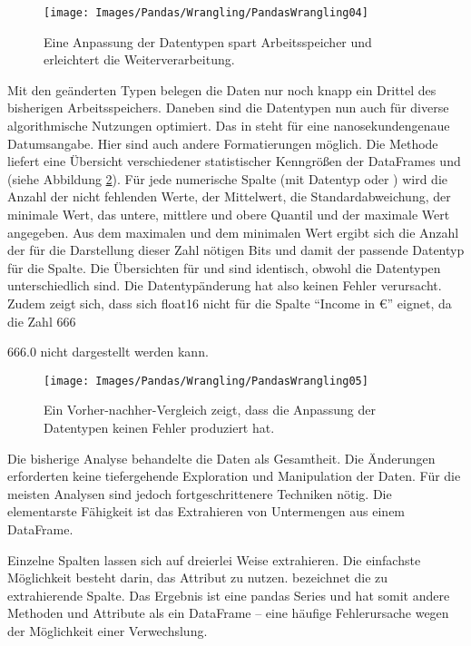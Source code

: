 \begin{figure}
    \centering
    \texttt{[image: Images/Pandas/Wrangling/PandasWrangling04]}    
    \caption{Eine Anpassung der Datentypen spart Arbeitsspeicher und erleichtert die Weiterverarbeitung.} \label{PandasWrangling04}
\end{figure}

Mit den geänderten Typen belegen die Daten nur noch knapp ein Drittel des bisherigen Arbeitsspeichers. Daneben sind die Datentypen nun auch für diverse algorithmische Nutzungen  optimiert. Das  in  steht für eine nanosekundengenaue   Datumsangabe. Hier sind auch andere Formatierungen möglich. Die Methode  liefert eine Übersicht verschiedener statistischer Kenngrößen der DataFrames  und  (siehe Abbildung  \ref{PandasWrangling05}). Für jede numerische Spalte (mit Datentyp  oder ) wird die Anzahl der nicht fehlenden Werte, der Mittelwert, die Standardabweichung, der minimale Wert, das untere, mittlere und obere Quantil und der maximale Wert angegeben. Aus dem maximalen und dem minimalen Wert ergibt sich die Anzahl der für die Darstellung dieser Zahl nötigen Bits und damit der passende Datentyp für die Spalte. Die Übersichten für  und  sind identisch, obwohl die Datentypen unterschiedlich sind. Die Datentypänderung hat also keinen Fehler verursacht. Zudem zeigt sich, dass sich float16 nicht für die Spalte ``Income in \euro{}'' eignet, da die Zahl 666
             
666.0 nicht dargestellt werden kann.

\begin{figure}
    \centering
    \texttt{[image: Images/Pandas/Wrangling/PandasWrangling05]}    
    \caption{Ein Vorher-nachher-Vergleich zeigt, dass die Anpassung der Datentypen keinen Fehler produziert hat.} \label{PandasWrangling05}
\end{figure}

Die bisherige Analyse behandelte die Daten als Gesamtheit. Die Änderungen erforderten keine tiefergehende Exploration und Manipulation der Daten. Für die meisten Analysen sind jedoch fortgeschrittenere Techniken nötig. Die elementarste Fähigkeit ist das Extrahieren von Untermengen aus einem DataFrame.

Einzelne Spalten lassen sich auf dreierlei Weise extrahieren. Die einfachste Möglichkeit besteht darin, das Attribut  zu nutzen.  bezeichnet die zu extrahierende Spalte. Das Ergebnis ist eine pandas Series und hat somit andere Methoden und Attribute als ein DataFrame -- eine häufige Fehlerursache wegen der Möglichkeit einer Verwechslung.


